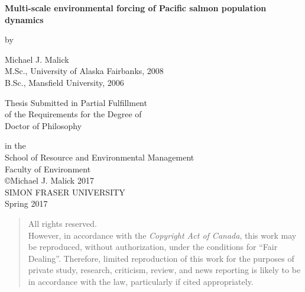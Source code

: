


\vspace*{-11mm}
\begin{center}

\begin{spacing}{2.0}
  { \large \textbf{Multi-scale environmental forcing of Pacific salmon
                   population dynamics}}

\end{spacing}

\vspace{8mm}
by
\vspace{8mm}

\begin{doublespace}
Michael J. Malick  \\
M.Sc., University of Alaska Fairbanks, 2008 \\
B.Sc., Mansfield University, 2006 \\
\end{doublespace}

\vspace{10mm}
Thesis Submitted in Partial Fulfillment \\
of the Requirements for the Degree of \\

\vspace{5mm}
Doctor of Philosophy \\
\vspace{5mm}

in the \\
School of Resource and Environmental Management \\
Faculty of Environment \\

\vspace{10mm}
\copyright Michael J. Malick 2017 \\
SIMON FRASER UNIVERSITY \\
Spring 2017 \\

\vspace{15mm}
\begin{quote}
  \begin{center}
All rights reserved. \\
However, in accordance with the \emph{Copyright Act of Canada},
this work may be reproduced, without authorization, under the conditions for
``Fair Dealing''. Therefore, limited reproduction of this work for the purposes
of private study, research, criticism, review, and news reporting is likely to
be in accordance with the law, particularly if cited appropriately.
  \end{center}
\end{quote}


\end{center}

